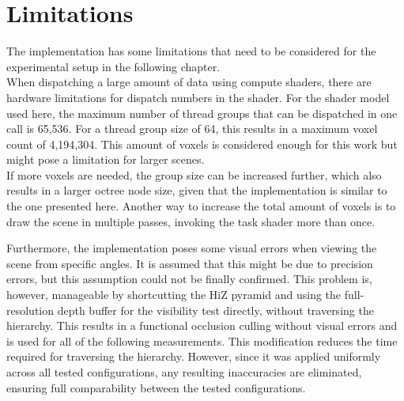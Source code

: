 \vspace{0.5cm}

\section{Limitations} \label{sec-implementation-limitations}

The implementation has some limitations that need to be considered for the experimental setup 
in the following chapter. \\

\noindent
When dispatching a large amount of data using compute shaders, there are hardware limitations for 
dispatch numbers in the shader. For the shader model used here, the maximum number of thread groups 
that can be dispatched in one call is 65,536. For a thread group size of 64, this results in a 
maximum voxel count of 4,194,304. This amount of voxels is considered enough for this work but 
might pose a limitation for larger scenes. \\

\noindent
If more voxels are needed, the group size can be increased further, which also results in a larger 
octree node size, given that the implementation is similar to the one presented here. Another way 
to increase the total amount of voxels is to draw the scene in multiple passes, invoking the task 
shader more than once. \\
\enlargethispage{\baselineskip}

\noindent
Furthermore, the implementation poses some visual errors when viewing the scene from specific 
angles. It is assumed that this might be due to precision errors, but this assumption could not 
be finally confirmed. This problem is, however, manageable by shortcutting the \ac{HiZ} pyramid 
and using the full-resolution depth buffer for the visibility test directly, without traversing 
the hierarchy. This results in a functional occlusion culling without visual errors and is used 
for all of the following measurements. This modification reduces the time required for traversing 
the hierarchy. However, since it was applied uniformly across all tested configurations, any 
resulting inaccuracies are eliminated, ensuring full comparability between the tested configurations. 
